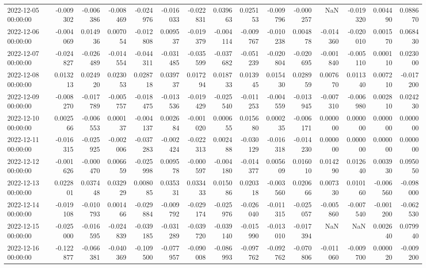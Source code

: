 \begin{tabular}{lrrrrrrrrrrrrrr}
2022-12-05 00:00:00 & -0.009302 & -0.006386 & -0.008469 & -0.024976 & -0.016033 & -0.022831 & 0.039663 & 0.025153 & -0.009796 & -0.000257 & NaN & -0.019320 & 0.004490 & 0.088670 \\
2022-12-06 00:00:00 & -0.004069 & 0.014936 & 0.007054 & -0.012808 & 0.009537 & -0.019379 & -0.004114 & -0.009767 & -0.010238 & 0.004878 & -0.014360 & -0.020010 & 0.001570 & 0.068430 \\
2022-12-07 00:00:00 & -0.024827 & -0.026489 & -0.014554 & -0.044311 & -0.031485 & -0.035599 & -0.037682 & -0.051239 & -0.020804 & -0.020695 & -0.001840 & -0.005110 & 0.000110 & 0.023000 \\
2022-12-08 00:00:00 & 0.013213 & 0.024920 & 0.023053 & 0.028718 & 0.039737 & 0.017294 & 0.018733 & 0.013945 & 0.015430 & 0.028959 & 0.007670 & 0.011340 & 0.007210 & -0.017200 \\
2022-12-09 00:00:00 & -0.008270 & -0.017789 & -0.005757 & -0.018475 & -0.013536 & -0.019429 & -0.025540 & -0.011253 & -0.004559 & -0.013945 & -0.007310 & -0.006980 & 0.002810 & 0.024230 \\
2022-12-10 00:00:00 & 0.002566 & -0.006553 & 0.000137 & -0.004137 & 0.002684 & -0.001020 & 0.000655 & 0.015680 & 0.000235 & -0.006171 & 0.000000 & 0.000000 & 0.000000 & 0.000000 \\
2022-12-11 00:00:00 & -0.016315 & -0.025925 & -0.002006 & -0.037283 & -0.002424 & -0.022313 & 0.002488 & -0.030129 & -0.016318 & -0.014230 & 0.000000 & 0.000000 & 0.000000 & 0.000000 \\
2022-12-12 00:00:00 & -0.001626 & -0.000470 & 0.006659 & -0.025998 & 0.009578 & -0.000597 & -0.004180 & -0.014377 & 0.005609 & 0.016010 & 0.014290 & 0.012640 & 0.003930 & 0.095050 \\
2022-12-13 00:00:00 & 0.022801 & 0.037448 & 0.032929 & 0.008085 & 0.035331 & 0.033433 & 0.015086 & 0.020318 & -0.003560 & 0.020666 & 0.007330 & 0.010160 & -0.006560 & -0.098000 \\
2022-12-14 00:00:00 & -0.019108 & -0.010793 & 0.001466 & -0.029884 & -0.009792 & -0.029174 & -0.025976 & -0.026040 & -0.011315 & -0.025057 & -0.005860 & -0.007540 & -0.001200 & -0.062530 \\
2022-12-15 00:00:00 & -0.025000 & -0.016595 & -0.024839 & -0.039185 & -0.031289 & -0.039720 & -0.039140 & -0.015990 & -0.013010 & -0.017394 & NaN & NaN & 0.002640 & 0.079940 \\
2022-12-16 00:00:00 & -0.122877 & -0.066381 & -0.040369 & -0.109500 & -0.077957 & -0.090008 & -0.086993 & -0.097762 & -0.092762 & -0.070806 & -0.011060 & -0.009700 & 0.000020 & -0.009200 \\

\end{tabular}
